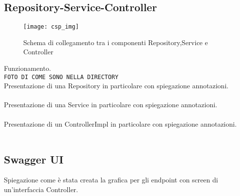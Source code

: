 \subsection{Repository-Service-Controller}

\begin{figure}[H] 
    \centering 
    \texttt{[image: csp\_img]} 
    \caption{Schema di collegamento tra i componenti Repository,Service e Controller}
\end{figure}

\noindent Funzionamento.\\

\noindent \texttt{FOTO DI COME SONO NELLA DIRECTORY}\\

\noindent Presentazione di una Repository in particolare con spiegazione annotazioni.\\\\
Presentazione di una Service in particolare con spiegazione annotazioni.\\\\
Presentazione di un ControllerImpl in particolare con spiegazione annotazioni.\\\\

\subsection{Swagger UI}
Spiegazione come è stata creata la grafica per gli endpoint con screen di un'interfaccia Controller.